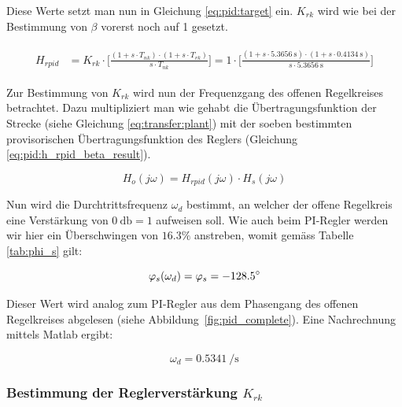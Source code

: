 Diese  Werte setzt man nun in Gleichung \ref{eq:pid:target} ein. $K_{rk}$ wird
wie bei der Bestimmung von $\beta$ vorerst noch auf 1 gesetzt.

\begin{gather} \label{eq:pid:h_rpid_beta_result}
    \begin{split}
        H_{rpid} & = K_{rk} \cdot \biggl[ \frac{(1 + s \cdot T_{nk}               ) \cdot (1 + s \cdot T_{vk}               ) }{ s \cdot T_{nk}               } \biggr]
                   = 1      \cdot \biggl[ \frac{(1 + s \cdot \SI{5.3656}{\second} ) \cdot (1 + s \cdot \SI{0.4134}{\second} ) }{ s \cdot \SI{5.3656}{\second} } \biggr]
    \end{split}
\end{gather}

Zur Bestimmung von $K_{rk}$ wird nun der Frequenzgang des offenen Regelkreises
betrachtet. Dazu  multipliziert  man  wie  gehabt  die  \"Ubertragungsfunktion
der  Strecke   (siehe  Gleichung   \ref{eq:transfer:plant})  mit   der  soeben
bestimmten  provisorischen   \"Ubertragungsfunktion  des   Reglers  (Gleichung
\ref{eq:pid:h_rpid_beta_result}).

\begin{equation} \label{eq:pid:h_o_k_rk_one}
    H_{o}(j\omega) = H_{rpid}(j\omega) \cdot H_s(j\omega)
\end{equation}

Nun wird  die Durchtrittsfrequenz $\omega_d$  bestimmt, an welcher  der offene
Regelkreis eine  Verst\"arkung von $\SI{0}{\decibel} =  1$ aufweisen soll. Wie
auch  beim  PI-Regler  werden  wir   hier  ein  \"Uberschwingen  von  $16.3\%$
anstreben, womit gem\"ass Tabelle \ref{tab:phi_s} gilt:

\begin{equation} \label{eq:pid:omega_d_target}
    \varphi_s(\omega_d) = \varphi_s = -128.5\degree
\end{equation}

Dieser   Wert   wird   analog   zum   PI-Regler   aus   dem   Phasengang   des
offenen Regelkreises  abgelesen (siehe Abbildung~\ref{fig:pid_complete}). Eine
Nachrechnung mittels Matlab ergibt:

\begin{equation} \label{eq:pid:omega_d_target}
    \omega_d = \SI{0.5341}{\per\second}
\end{equation}


\subsubsection{Bestimmung der Reglerverst\"arkung $K_{rk}$}

